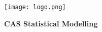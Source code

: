 \noindent
\begin{minipage}[t]{0.4\textwidth} 
\texttt{[image: logo.png]}
\end{minipage}%
\hfill%
\begin{minipage}[t]{0.6\textwidth}\raggedleft
\textbf{\large CAS Statistical Modelling}
\end{minipage}


